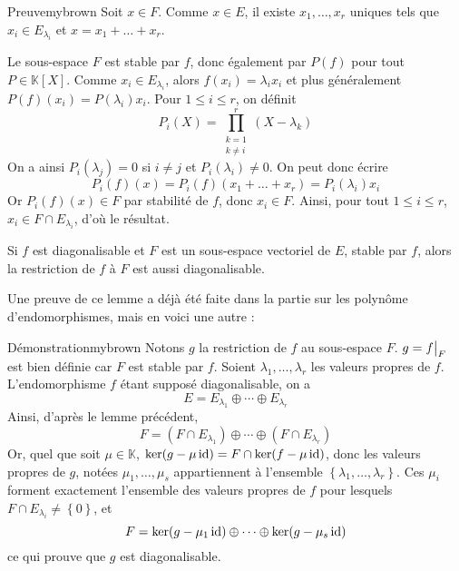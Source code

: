     \begin{demo}{Preuve}{mybrown}
        Soit $x \in F$. Comme $x \in E$, il existe $x_1,\ldots,x_r$ uniques tels que $x_i \in E_{\lambda_i}$ et $x = x_1 + \ldots + x_r$. 

        Le sous-espace $F$ est stable par $f$, donc également par $P(f)$ pour tout $P \in \mathbb{K}[X]$. Comme $x_i \in E_{\lambda_i}$, alors $f(x_i) = \lambda_i x_i$ et plus généralement $P(f)(x_i) = P(\lambda_i) x_i$. Pour $1 \leq i \leq r$, on définit 
        \[ P_i(X) = \prod_{\substack{k = 1 \\ k \neq i}}^{r} (X - \lambda_k) \]    
        On a ainsi $P_i(\lambda_j) = 0$ si $i \neq j$ et $P_i(\lambda_i) \neq 0$. On peut donc écrire 
        \[ P_i(f)(x) = P_i(f)(x_1 + \ldots + x_r) = P_i(\lambda_i) x_i \]    
        Or $P_i(f)(x) \in F$ par stabilité de $f$, donc $x_i \in F$. Ainsi, pour tout $1 \leq i \leq r$, $x_i \in F \cap E_{\lambda_i}$, d’où le résultat.
    \end{demo}

    \begin{lem}{}{}
        Si $f$ est diagonalisable et $F$ est un sous-espace vectoriel de $E$, stable par $f$, alors la restriction de $f$ à $F$ est aussi diagonalisable. 
    \end{lem}

    Une preuve de ce lemme a déjà été faite dans la partie sur les polynôme d’endomorphismes, mais en voici une autre : 

    \begin{demo}{Démonstration}{mybrown}
        Notons $g$ la restriction de $f$ au sous-espace $F$. $g = \restr{f}{F}$ est bien définie car $F$ est stable par $f$. Soient $ \lambda_1,\ldots, \lambda_r$ les valeurs propres de $f$. L’endomorphisme $f$ étant supposé diagonalisable, on a 
        \[ E = E_{\lambda_1} \oplus \cdots \oplus E_{\lambda_r} \]   
        Ainsi, d’après le lemme précédent, 
        \[ F = (F \cap E_{\lambda_1}) \oplus \cdots \oplus (F \cap E_{\lambda_r}) \]    
        Or, quel que soit $\mu \in \mathbb{K}$, $\ker(g - \mu \operatorname{id}) = F \cap \ker(f - \mu \operatorname{id})$, donc les valeurs propres de $g$, notées $\mu_1,\ldots,\mu_s$ appartiennent à l’ensemble $\left\{\lambda_1,\ldots,\lambda_r\right\}$. Ces $\mu_i$ forment exactement l’ensemble des valeurs propres de $f$ pour lesquels $F \cap E_{\lambda_i} \neq \left\{0\right\}$, et 
        \[ F = \ker(g - \mu_1 \operatorname{id}) \oplus \cdots \oplus \ker(g - \mu_s \operatorname{id}) \]    
        ce qui prouve que $g$ est diagonalisable.
    \end{demo}

